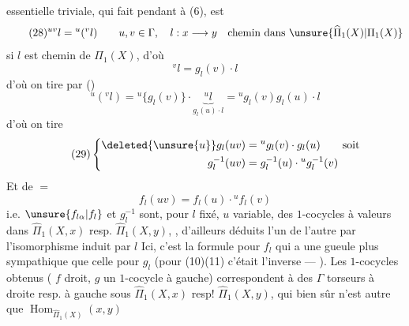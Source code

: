 essentielle triviale, qui fait pendant à (6), est
\[
\tag{28}{}^{uv}l={}^u({}^vl)
\qquad u,v\in\Gamma,\quad l:x\longrightarrow y\quad\text{chemin dans }\unsure{\widehat\Pi_1(X)|\Pi_1(X)}
\]
 si $l$ est chemin de $\Pi_1(X)$, d'où
\[
{}^vl=g_l(v)\cdot l
\]
 d'où on tire par ()
\[
{}^u({}^vl)={}^u\{g_l(v)\}\cdot\underbrace{{}^ul}_{g_l(u)\cdot l}
={}^ug_l(v)g_l(u)\cdot l
\]
d'où on tire
\[
\tag{29}\left\{\begin{aligned}
\deleted{\unsure{u}}g_l(uv)&={}^ug_l(v)\cdot g_l(u)\qquad\text{soit}\\
g_l^{-1}(uv)&=g_l^{-1}(u)\cdot{}^ug_l^{-1}(v)
\end{aligned}\right.
\]
Et de $=$
\[
\tag{30}f_l(uv)=f_l(u)\cdot{}^uf_l(v)
\]
i.e. $\unsure{f_{l\alpha}|f_l}$ et $g_l^{-1}$ sont, pour $l$ fixé, $u$ variable, des $1$-cocycles  à valeurs dans $\widehat\Pi_1(X,x)$ resp. $\widehat\Pi_1(X,y)$, , d'ailleurs déduits l'un de l'autre par l'isomorphisme
induit par $l$  Ici, c'est la formule pour $f_l$ qui a une gueule plus sympathique que celle pour $g_l$ (pour (10)(11) c'était l'inverse ---  ). Les $1$-cocycles obtenus ( $f$  droit, $g$ un $1$-cocycle à gauche) correspondent à des $\Gamma$ torseurs à droite resp. à gauche sous $\widehat\Pi_1(X,x)$ resp! $\widehat\Pi_1(X,y)$, qui bien sûr n'est autre que $\operatorname{Hom}_{\widehat\Pi_1(X)}(x,y)$

